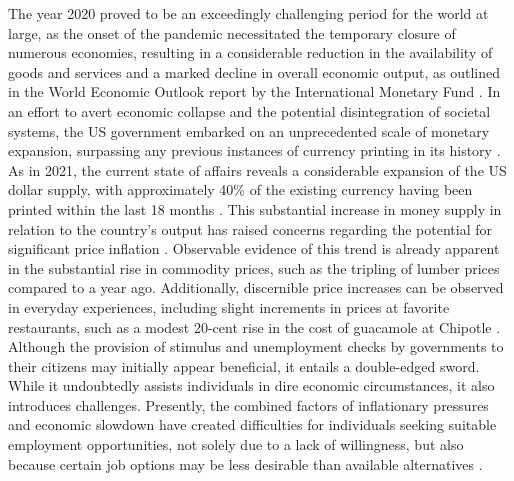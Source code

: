 The year 2020 proved to be an exceedingly challenging period for the world at large, as the onset of the pandemic necessitated the temporary
closure of numerous economies, resulting in a considerable reduction in the availability of goods and services and a marked decline in overall
economic output, as outlined in the World Economic Outlook report by the International Monetary Fund \cite{imf2020}. In an effort to avert
economic collapse and the potential disintegration of societal systems, the US government embarked on an unprecedented scale of monetary
expansion, surpassing any previous instances of currency printing in its history \cite{blinder2020}. As in 2021, the current state of affairs
reveals a considerable expansion of the US dollar supply, with approximately 40\% of the existing currency having been printed within the last
18 months \cite{fedmoneysupply}. This substantial increase in money supply in relation to the country's output has raised concerns regarding
the potential for significant price inflation \cite{Blanchard2021}. Observable evidence of this trend is already apparent in the substantial
rise in commodity prices, such as the tripling of lumber prices compared to a year ago. Additionally, discernible price increases can be
observed in everyday experiences, including slight increments in prices at favorite restaurants, such as a modest 20-cent rise in the cost of
guacamole at Chipotle \cite{BLS}. Although the provision of stimulus and unemployment checks by governments to their citizens may initially
appear beneficial, it entails a double-edged sword. While it undoubtedly assists individuals in dire economic circumstances, it also introduces
challenges. Presently, the combined factors of inflationary pressures and economic slowdown have created difficulties for individuals seeking
suitable employment opportunities, not solely due to a lack of willingness, but also because certain job options may be less desirable than
available alternatives \cite{cbo2020, kahn2020}.

